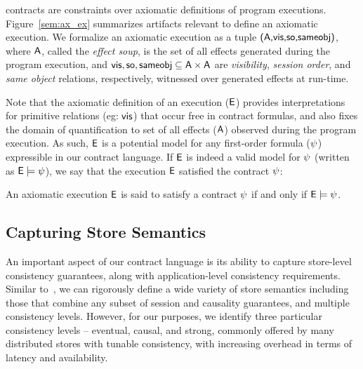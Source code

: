 \quelea contracts are constraints over axiomatic definitions of program
executions. Figure~\ref{sem:ax_ex} summarizes artifacts relevant to define
an axiomatic execution. We formalize an axiomatic execution as a tuple ${\normalfont \textsf{({\normalfont \textsf{A}},\allowbreak {\normalfont \textsf{vis}},\allowbreak {\normalfont \textsf{so}},\allowbreak {\normalfont \textsf{sameobj}})}}$,
where ${\normalfont \textsf{A}}$, called the \emph{effect soup}, is the set of all effects
generated during the program execution, and ${\normalfont \textsf{vis}},{\normalfont \textsf{so}},{\normalfont \textsf{sameobj}} \subseteq
{\normalfont \textsf{A}} \times {\normalfont \textsf{A}}$ are \emph{visibility}, \emph{session order}, and
\emph{same object} relations, respectively, witnessed over generated effects at
run-time.

Note that the axiomatic definition of an execution (${\normalfont \textsf{E}}$) provides
interpretations for primitive relations (eg: ${\normalfont \textsf{vis}}$) that occur free in
contract formulas, and also fixes the domain of quantification to set of all
effects (${\normalfont \textsf{A}}$) observed during the program execution. As such, ${\normalfont \textsf{E}}$ is a
potential model for any first-order formula ($\psi$) expressible in our contract
language. If ${\normalfont \textsf{E}}$ is indeed a valid model for $\psi$ (written as ${\normalfont \textsf{E}} \models
\psi$), we say that the execution ${\normalfont \textsf{E}}$ satisfied the contract $\psi$:

\begin{definition}
An axiomatic execution ${\normalfont \textsf{E}}$ is said to satisfy a contract $\psi$ if and only if
${\normalfont \textsf{E}} \models \psi$.
\end{definition}

\subsection{Capturing Store Semantics}
\label{q_sec:store_sem}

An important aspect of our contract language is its ability to capture
store-level consistency guarantees, along with application-level consistency
requirements. Similar to~\cite{Burckhardt2014}, we can rigorously define a wide
variety of store semantics including those that combine any subset of session
and causality guarantees, and multiple consistency levels.  However, for our
purposes, we identify three particular consistency levels -- eventual, causal,
and strong, commonly offered by many distributed stores with tunable
consistency, with increasing overhead in terms of latency and availability.

